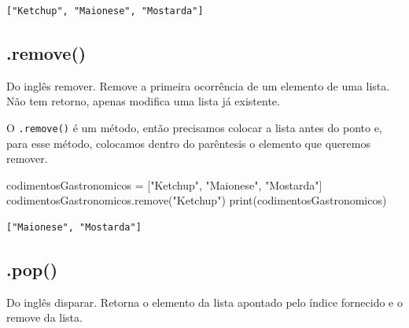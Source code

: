 \documentclass[
  letterpaper,
  DIV=11,
  numbers=noendperiod]{scrreprt}
\newenvironment{Shaded}{\begin{snugshade}}{\end{snugshade}}
\newcommand{\BuiltInTok}[1]{\textcolor[rgb]{0.00,0.23,0.31}{#1}}
\newcommand{\NormalTok}[1]{\textcolor[rgb]{0.00,0.23,0.31}{#1}}
\newcommand{\OperatorTok}[1]{\textcolor[rgb]{0.37,0.37,0.37}{#1}}
\newcommand{\StringTok}[1]{\textcolor[rgb]{0.13,0.47,0.30}{#1}}
\begin{document}
\begin{tcolorbox}[enhanced jigsaw, breakable, leftrule=.75mm, left=2mm, opacityback=0, bottomrule=.15mm, toprule=.15mm, rightrule=.15mm, arc=.35mm, colback=white]

\begin{verbatim}
["Ketchup", "Maionese", "Mostarda"]
\end{verbatim}

\end{tcolorbox}

\hypertarget{remove}{%
\subsection{.remove()}\label{remove}}

Do inglês remover. Remove a primeira ocorrência de um elemento de uma
lista. Não tem retorno, apenas modifica uma lista já existente.

O \texttt{.remove()} é um método, então precisamos colocar a lista antes
do ponto e, para esse método, colocamos dentro do parêntesis o elemento
que queremos remover.

\begin{Shaded}
\begin{Highlighting}[]
\NormalTok{codimentosGastronomicos }\OperatorTok{=}\NormalTok{ [}\StringTok{"Ketchup"}\NormalTok{, }\StringTok{"Maionese"}\NormalTok{, }\StringTok{"Mostarda"}\NormalTok{]}
\NormalTok{codimentosGastronomicos.remove(}\StringTok{"Ketchup"}\NormalTok{)}
\BuiltInTok{print}\NormalTok{(codimentosGastronomicos)}
\end{Highlighting}
\end{Shaded}

\begin{tcolorbox}[enhanced jigsaw, breakable, leftrule=.75mm, left=2mm, opacityback=0, bottomrule=.15mm, toprule=.15mm, rightrule=.15mm, arc=.35mm, colback=white]

\begin{verbatim}
["Maionese", "Mostarda"]
\end{verbatim}

\end{tcolorbox}

\hypertarget{pop}{%
\subsection{.pop()}\label{pop}}

Do inglês disparar. Retorna o elemento da lista apontado pelo índice
fornecido e o remove da lista.
\end{document}
